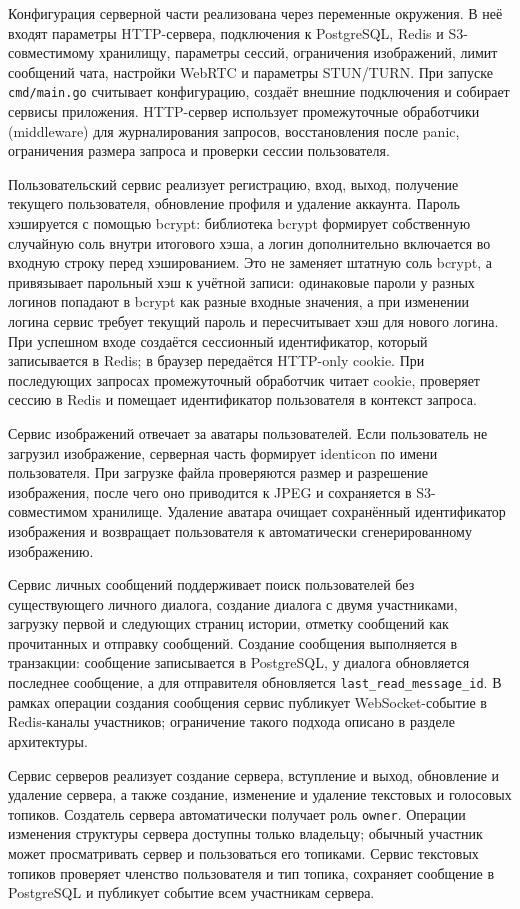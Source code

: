 \documentclass[a4paper,12pt]{extarticle}
\begin{document}
Конфигурация серверной части реализована через переменные окружения. В неё входят параметры HTTP-сервера, подключения к PostgreSQL, Redis и S3-совместимому хранилищу, параметры сессий, ограничения изображений, лимит сообщений чата, настройки WebRTC и параметры STUN/TURN. При запуске \texttt{cmd/main.go} считывает конфигурацию, создаёт внешние подключения и собирает сервисы приложения. HTTP-сервер использует промежуточные обработчики (middleware) для журналирования запросов, восстановления после panic, ограничения размера запроса и проверки сессии пользователя.

Пользовательский сервис реализует регистрацию, вход, выход, получение текущего пользователя, обновление профиля и удаление аккаунта. Пароль хэшируется с помощью bcrypt: библиотека bcrypt формирует собственную случайную соль внутри итогового хэша, а логин дополнительно включается во входную строку перед хэшированием. Это не заменяет штатную соль bcrypt, а привязывает парольный хэш к учётной записи: одинаковые пароли у разных логинов попадают в bcrypt как разные входные значения, а при изменении логина сервис требует текущий пароль и пересчитывает хэш для нового логина. При успешном входе создаётся сессионный идентификатор, который записывается в Redis; в браузер передаётся HTTP-only cookie. При последующих запросах промежуточный обработчик читает cookie, проверяет сессию в Redis и помещает идентификатор пользователя в контекст запроса.

Сервис изображений отвечает за аватары пользователей. Если пользователь не загрузил изображение, серверная часть формирует identicon по имени пользователя. При загрузке файла проверяются размер и разрешение изображения, после чего оно приводится к JPEG и сохраняется в S3-совместимом хранилище. Удаление аватара очищает сохранённый идентификатор изображения и возвращает пользователя к автоматически сгенерированному изображению.

Сервис личных сообщений поддерживает поиск пользователей без существующего личного диалога, создание диалога с двумя участниками, загрузку первой и следующих страниц истории, отметку сообщений как прочитанных и отправку сообщений. Создание сообщения выполняется в транзакции: сообщение записывается в PostgreSQL, у диалога обновляется последнее сообщение, а для отправителя обновляется \texttt{last\_read\_message\_id}. В рамках операции создания сообщения сервис публикует WebSocket-событие в Redis-каналы участников; ограничение такого подхода описано в разделе архитектуры.

Сервис серверов реализует создание сервера, вступление и выход, обновление и удаление сервера, а также создание, изменение и удаление текстовых и голосовых топиков. Создатель сервера автоматически получает роль \texttt{owner}. Операции изменения структуры сервера доступны только владельцу; обычный участник может просматривать сервер и пользоваться его топиками. Сервис текстовых топиков проверяет членство пользователя и тип топика, сохраняет сообщение в PostgreSQL и публикует событие всем участникам сервера.
\end{document}
